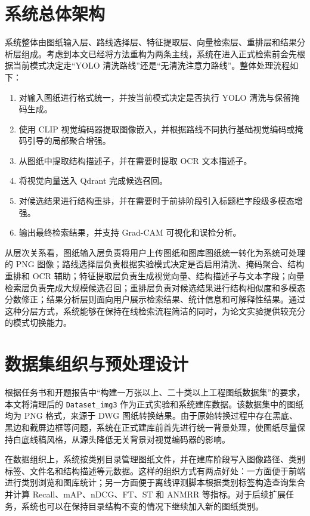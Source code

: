 \section{系统总体架构}

系统整体由图纸输入层、路线选择层、特征提取层、向量检索层、重排层和结果分析层组成。考虑到本文已经将方法重构为两条主线，系统在进入正式检索前会先根据当前模式决定走“YOLO 清洗路线”还是“无清洗注意力路线”。整体处理流程如下：

\begin{enumerate}
  \item 对输入图纸进行格式统一，并按当前模式决定是否执行 YOLO 清洗与保留掩码生成。
  \item 使用 CLIP 视觉编码器提取图像嵌入，并根据路线不同执行基础视觉编码或掩码引导的局部聚合增强。
  \item 从图纸中提取结构描述子，并在需要时提取 OCR 文本描述子。
  \item 将视觉向量送入 Qdrant 完成候选召回。
  \item 对候选结果进行结构重排，并在需要时于前排阶段引入标题栏字段级多模态增强。
  \item 输出最终检索结果，并支持 Grad-CAM 可视化和误检分析。
\end{enumerate}

从层次关系看，图纸输入层负责将用户上传图纸和图库图纸统一转化为系统可处理的 PNG 图像；路线选择层负责根据实验模式决定是否启用清洗、掩码聚合、结构重排和 OCR 辅助；特征提取层负责生成视觉向量、结构描述子与文本字段；向量检索层负责完成大规模候选召回；重排层负责对候选结果进行结构相似度和多模态分数修正；结果分析层则面向用户展示检索结果、统计信息和可解释性结果。通过这种分层方式，系统能够在保持在线检索流程简洁的同时，为论文实验提供较充分的模式切换能力。

\section{数据集组织与预处理设计}

根据任务书和开题报告中“构建一万张以上、二十类以上工程图纸数据集”的要求，本文将清理后的 \texttt{Dataset\_img3} 作为正式实验和系统建库数据。该数据集中的图纸均为 PNG 格式，来源于 DWG 图纸转换结果。由于原始转换过程中存在黑底、黑边和截屏边框等问题，系统在正式建库前首先进行统一背景处理，使图纸尽量保持白底线稿风格，从源头降低无关背景对视觉编码器的影响。

在数据组织上，系统按类别目录管理图纸文件，并在建库阶段写入图像路径、类别标签、文件名和结构描述等元数据。这样的组织方式有两点好处：一方面便于前端进行类别浏览和图库统计；另一方面便于离线评测脚本根据类别标签构造查询集合并计算 Recall、mAP、nDCG、FT、ST 和 ANMRR 等指标。对于后续扩展任务，系统也可以在保持目录结构不变的情况下继续加入新的图纸类别。

